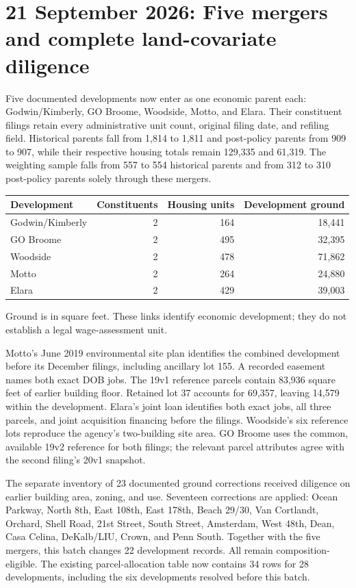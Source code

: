 \clearpage
\section{21 September 2026: Five mergers and complete land-covariate diligence}

Five documented developments now enter as one economic parent each:
Godwin/Kimberly, GO Broome, Woodside, Motto, and Elara. Their constituent
filings retain every administrative unit count, original filing date, and
refiling field. Historical parents fall from 1,814 to 1,811 and post-policy
parents from 909 to 907, while their respective housing totals remain 129,335
and 61,319. The weighting sample falls from 557 to 554 historical parents
and from 312 to 310 post-policy parents solely through these mergers.

\begin{center}
\small
\begin{tabular}{lrrr}
\hline
Development & Constituents & Housing units & Development ground \\
\hline
Godwin/Kimberly & 2 & 164 & 18,441 \\
GO Broome & 2 & 495 & 32,395 \\
Woodside & 2 & 478 & 71,862 \\
Motto & 2 & 264 & 24,880 \\
Elara & 2 & 429 & 39,003 \\
\hline
\end{tabular}
\end{center}
\noindent Ground is in square feet. These links identify economic development;
they do not establish a legal wage-assessment unit.

Motto's June 2019 environmental site plan identifies the combined development
before its December filings, including ancillary lot 155. A recorded easement
names both exact DOB jobs. The 19v1 reference parcels contain 83,936 square
feet of earlier building floor. Retained lot 37 accounts for 69,357, leaving
14,579 within the development. Elara's joint loan identifies both exact jobs,
all three parcels, and joint acquisition financing before the filings.
Woodside's six reference lots reproduce the agency's two-building site area.
GO Broome uses the common, available 19v2 reference for both filings; the
relevant parcel attributes agree with the second filing's 20v1 snapshot.

The separate inventory of 23 documented ground corrections received diligence
on earlier building area, zoning, and use. Seventeen corrections are applied:
Ocean Parkway, North 8th, East 108th, East 178th, Beach 29/30, Van Cortlandt,
Orchard, Shell Road, 21st Street, South Street, Amsterdam, West 48th, Dean,
Casa Celina, DeKalb/LIU, Crown, and Penn South. Together with the five mergers,
this batch changes 22 development records. All remain composition-eligible.
The existing parcel-allocation table now contains 34 rows for 28 developments,
including the six developments resolved before this batch.


